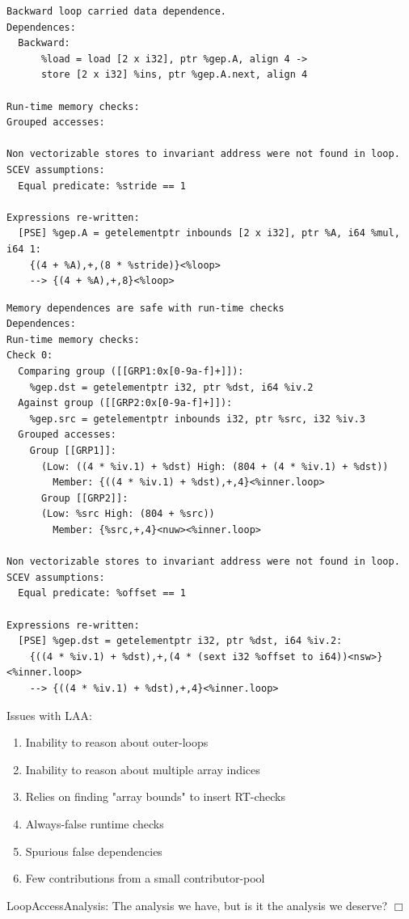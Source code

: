 \documentclass{beamer}
\begin{document}
\begin{frame}[containsverbatim]
  \begin{adjustwidth}{-1em}{-1em}
    \begin{verbatim}
Backward loop carried data dependence.
Dependences:
  Backward:
      %load = load [2 x i32], ptr %gep.A, align 4 ->
      store [2 x i32] %ins, ptr %gep.A.next, align 4

Run-time memory checks:
Grouped accesses:

Non vectorizable stores to invariant address were not found in loop.
SCEV assumptions:
  Equal predicate: %stride == 1

Expressions re-written:
  [PSE] %gep.A = getelementptr inbounds [2 x i32], ptr %A, i64 %mul, i64 1:
    {(4 + %A),+,(8 * %stride)}<%loop>
    --> {(4 + %A),+,8}<%loop>
    \end{verbatim}
  \end{adjustwidth}
\end{frame}

\begin{frame}[containsverbatim]
  \begin{adjustwidth}{-1em}{-1em}
    \begin{verbatim}
Memory dependences are safe with run-time checks
Dependences:
Run-time memory checks:
Check 0:
  Comparing group ([[GRP1:0x[0-9a-f]+]]):
    %gep.dst = getelementptr i32, ptr %dst, i64 %iv.2
  Against group ([[GRP2:0x[0-9a-f]+]]):
    %gep.src = getelementptr inbounds i32, ptr %src, i32 %iv.3
  Grouped accesses:
    Group [[GRP1]]:
      (Low: ((4 * %iv.1) + %dst) High: (804 + (4 * %iv.1) + %dst))
        Member: {((4 * %iv.1) + %dst),+,4}<%inner.loop>
      Group [[GRP2]]:
      (Low: %src High: (804 + %src))
        Member: {%src,+,4}<nuw><%inner.loop>

Non vectorizable stores to invariant address were not found in loop.
SCEV assumptions:
  Equal predicate: %offset == 1

Expressions re-written:
  [PSE] %gep.dst = getelementptr i32, ptr %dst, i64 %iv.2:
    {((4 * %iv.1) + %dst),+,(4 * (sext i32 %offset to i64))<nsw>}<%inner.loop>
    --> {((4 * %iv.1) + %dst),+,4}<%inner.loop>
    \end{verbatim}
  \end{adjustwidth}
\end{frame}

\begin{frame}
  Issues with LAA:
  \begin{enumerate}
    \item Inability to reason about outer-loops
    \item Inability to reason about multiple array indices
    \item Relies on finding "array bounds" to insert RT-checks
    \item Always-false runtime checks
    \item Spurious false dependencies
    \item Few contributions from a small contributor-pool
  \end{enumerate}
\end{frame}

\begin{frame}
  LoopAccessAnalysis: The analysis we have, but is it the analysis we deserve? $\Box$
\end{frame}
\end{document}
